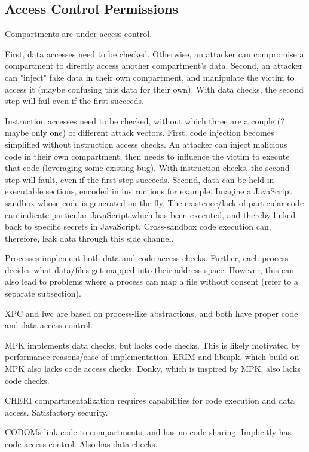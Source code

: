 \subsection{Access Control Permissions}

Compartments are under access control. 

First, data accesses need to be checked. 
Otherwise, an attacker can compromise a compartment to directly access another
compartment's data.
Second, an attacker can "inject" fake data in their own compartment, and 
manipulate the victim to access it (maybe confusing this data for their own).
With data checks, the second step will fail even if the first succeeds.

Instruction accesses need to be checked, without which three are a 
couple (? maybe only one) of different attack vectors.
First, code injection becomes simplified without instruction access checks.
An attacker can inject malicious code in their own compartment, then needs
to influence the victim to execute that code (leveraging some existing bug).
With instruction checks, the second step will fault, even if the first step
succeeds.
Second, data can be held in executable sections, encoded in instructions for example.
Imagine a JavaScript sandbox whose code is generated on the fly. 
The existence/lack of particular code can indicate particular JavaScript which has
been executed, and thereby linked back to specific secrets in JavaScript.
Cross-sandbox code execution can, therefore, leak data through this side channel.

Processes implement both data and code access checks. 
Further, each process decides what data/files get mapped into their address space.
However, this can also lead to problems where a process can map a file without
consent (refer to a separate subsection).

XPC and lwc are based on process-like abstractions, and both have proper
code and data access control.

MPK implements data checks, but lacks code checks. 
This is likely motivated by performance reasons/ease of implementation.
ERIM and libmpk, which build on MPK also lacks code access checks.
Donky, which is inspired by MPK, also lacks code checks.

CHERI compartmentalization requires capabilities for code execution and
data access. Satisfactory security.

CODOMs link code to compartments, and has no code sharing.
Implicitly has code access control.
Also has data checks.

